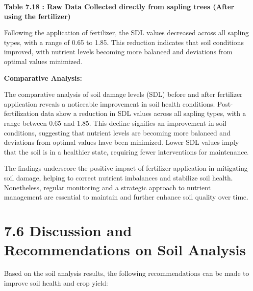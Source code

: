\documentclass{book} %
\begin{document}
\textbf{Table 7.18 : Raw Data Collected directly from sapling trees (After using the fertilizer)}

\noindent Following the application of fertilizer, the SDL values decreased across all sapling types, with a range of 0.65 to 1.85. This reduction indicates that soil conditions improved, with nutrient levels becoming more balanced and deviations from optimal values minimized.

\noindent \textbf{}

\noindent \textbf{Comparative Analysis:}

\noindent The comparative analysis of soil damage levels (SDL) before and after fertilizer application reveals a noticeable improvement in soil health conditions. Post-fertilization data show a reduction in SDL values across all sapling types, with a range between 0.65 and 1.85. This decline signifies an improvement in soil conditions, suggesting that nutrient levels are becoming more balanced and deviations from optimal values have been minimized. Lower SDL values imply that the soil is in a healthier state, requiring fewer interventions for maintenance.

\noindent The findings underscore the positive impact of fertilizer application in mitigating soil damage, helping to correct nutrient imbalances and stabilize soil health. Nonetheless, regular monitoring and a strategic approach to nutrient management are essential to maintain and further enhance soil quality over time.

\noindent 

\noindent 
\section{7.6 Discussion and Recommendations on Soil Analysis}

\noindent Based on the soil analysis results, the following recommendations can be made to improve soil health and crop yield:
\end{document}
